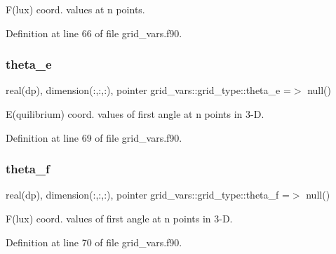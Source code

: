 F(lux) coord. values at n points. 



Definition at line 66 of file grid\+\_\+vars.\+f90.

\mbox{\label{structgrid__vars_1_1grid__type_ab0b41e4a204896b653c662b24ce1360e}} 
\subsubsection{\texorpdfstring{theta\+\_\+e}{theta\_e}}
{\footnotesize\ttfamily real(dp), dimension(\+:,\+:,\+:), pointer grid\+\_\+vars\+::grid\+\_\+type\+::theta\+\_\+e =$>$ null()}



E(quilibrium) coord. values of first angle at n points in 3-\/D. 



Definition at line 69 of file grid\+\_\+vars.\+f90.

\mbox{\label{structgrid__vars_1_1grid__type_a1a9efc98321f582b71ddb6d62c3e791b}} 
\subsubsection{\texorpdfstring{theta\+\_\+f}{theta\_f}}
{\footnotesize\ttfamily real(dp), dimension(\+:,\+:,\+:), pointer grid\+\_\+vars\+::grid\+\_\+type\+::theta\+\_\+f =$>$ null()}



F(lux) coord. values of first angle at n points in 3-\/D. 



Definition at line 70 of file grid\+\_\+vars.\+f90.

\mbox{\label{structgrid__vars_1_1grid__type_adebef5699de49c33289e03cda2875232}} 
